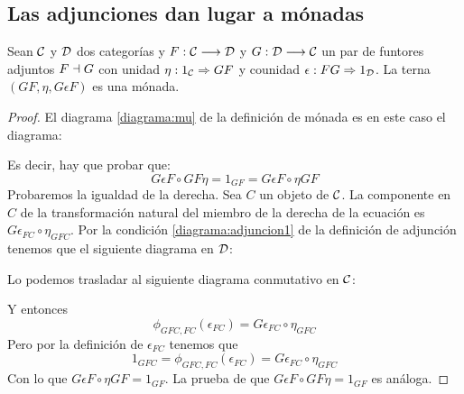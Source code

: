 \subsection{Las adjunciones dan lugar a mónadas}
\begin{theorem}
Sean $\mathcal{C}$ y $\mathcal{D}$ dos categorías y $F : \mathcal{C}\longrightarrow \mathcal{D}$ y $G: \mathcal{D}\longrightarrow \mathcal{C}$ un
par de funtores adjuntos $F \dashv G$ con unidad
$\eta : 1_{\mathcal{C}}\Rightarrow GF$ y counidad $\epsilon: FG\Rightarrow 1_{\mathcal{D}}$. La terna
$(GF, \eta, G\epsilon F)$ es una mónada.
\end{theorem}
\begin{proof}
  El diagrama \eqref{diagrama:mu} de la definición de mónada es en este
  caso el diagrama:
  \begin{center}
  \end{center}
  Es decir, hay que probar que:
  $$G\epsilon F \circ GF\eta = 1_{GF} = G\epsilon F \circ \eta GF$$
  Probaremos la igualdad de la derecha.
  Sea $C$ un objeto de $\mathcal{C}$. La componente en
  $C$ de la transformación natural del
  miembro de la derecha de la ecuación
  es $G\epsilon_{FC} \circ \eta_{GFC}$.
  Por la condición \eqref{diagrama:adjuncion1} de la definición de
  adjunción tenemos que el siguiente diagrama en $\mathcal{D}$:
  \begin{center}
  \end{center}
  Lo podemos trasladar al siguiente diagrama conmutativo en $\mathcal{C}$:
  \begin{center}
  \end{center}
  Y entonces $$\phi_{GFC, FC}(\epsilon_{FC}) = G\epsilon_{FC} \circ \eta_{GFC}$$
  Pero por la definición de $\epsilon_{FC}$ tenemos que
  $$1_{GFC} = \phi_{GFC, FC}(\epsilon_{FC}) = G\epsilon_{FC} \circ \eta_{GFC}$$
  Con lo que
  $G\epsilon F \circ \eta GF = 1_{GF}$. La prueba de que $G\epsilon F \circ GF\eta = 1_{GF}$ es análoga.



\end{proof}
